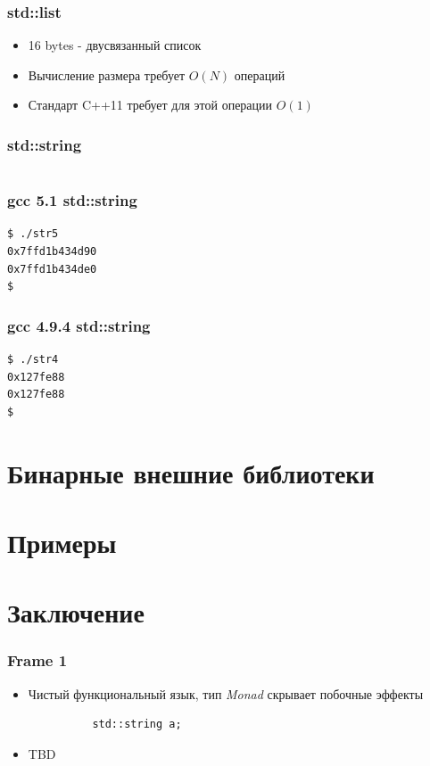 \documentclass{beamer}
\begin{document}
\begin{frame}[fragile]
\frametitle{std::list}
\begin{itemize}
\item 16 bytes - двусвязанный список
\item Вычисление размера требует $O(N)$ операций
\item Стандарт C++11 требует для этой операции $O(1)$
\end{itemize}
\end{frame}

\begin{frame}[fragile]
\frametitle{std::string}
\inputminted{c++}{../src/str.cpp}
\end{frame}

\begin{frame}[fragile]
\frametitle{gcc 5.1 std::string}
\begin{verbatim}
$ ./str5
0x7ffd1b434d90
0x7ffd1b434de0
$
\end{verbatim}
\end{frame}

\begin{frame}[fragile]
\frametitle{gcc 4.9.4 std::string}
\begin{verbatim}
$ ./str4
0x127fe88
0x127fe88
$
\end{verbatim}
\end{frame}


\section{Бинарные внешние библиотеки}

\section{Примеры}

\section{Заключение}

\begin{frame}[fragile]
\frametitle{Frame 1}
\begin{itemize}
\item<+-> Чистый функциональный язык, тип \emph{Monad} скрывает побочные эффекты
        \begin{verbatim}
          std::string a;
        \end{verbatim}
\item<+-> TBD
\end{itemize}
\end{frame}
\end{document}
